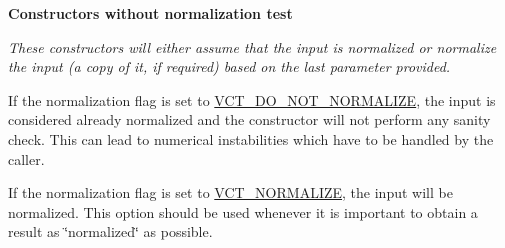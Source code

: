 \begin{Indent}{\bf Constructors without normalization test}\par
{\em These constructors will either assume that the input is normalized or normalize the input (a copy of it, if required) based on the last parameter provided.


\begin{DoxyItemize}
\item If the normalization flag is set to \hyperlink{vct_forward_declarations_8h_a6fd516b0c35fa9967b4da5f03a788985}{V\+C\+T\+\_\+\+D\+O\+\_\+\+N\+O\+T\+\_\+\+N\+O\+R\+M\+A\+L\+I\+Z\+E}, the input is considered already normalized and the constructor will not perform any sanity check. This can lead to numerical instabilities which have to be handled by the caller.


\item If the normalization flag is set to \hyperlink{vct_forward_declarations_8h_ae54c682b919a7c5743ea498810518565}{V\+C\+T\+\_\+\+N\+O\+R\+M\+A\+L\+I\+Z\+E}, the input will be normalized. This option should be used whenever it is important to obtain a result as \char`\"{}normalized\char`\"{} as possible.



\end{DoxyItemize}}
\end{Indent}
